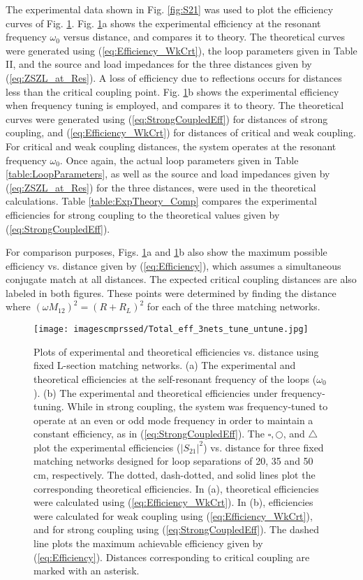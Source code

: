 \documentclass[journal]{IEEEtran}
\begin{document}
The experimental data shown in Fig. \ref{fig:S21} was used to plot the efficiency curves of Fig. \ref{fig:S21_v_Pow}. Fig. \ref{fig:S21_v_Pow}a shows the experimental efficiency at the resonant frequency $\omega_0$ versus distance, and compares it to theory. The theoretical curves were generated using (\ref{eq:Efficiency_WkCrt}), the loop parameters given in Table II, and the source and load impedances for the three distances given by (\ref{eq:ZSZL_at_Res}). A loss of efficiency due to reflections occurs for distances less than the critical coupling point. Fig. \ref{fig:S21_v_Pow}b shows the experimental efficiency when frequency tuning is employed, and compares it to theory. The theoretical curves were generated using (\ref{eq:StrongCoupledEff}) for distances of strong coupling, and (\ref{eq:Efficiency_WkCrt}) for distances of critical and weak coupling. For critical and weak coupling distances, the system operates at the resonant frequency $\omega_0$. Once again, the actual loop parameters given in Table \ref{table:LoopParameters}, as well as the source and load impedances given by (\ref{eq:ZSZL_at_Res}) for the three distances, were used in the theoretical calculations. Table \ref{table:ExpTheory_Comp} compares the experimental efficiencies for strong coupling to the theoretical values given by (\ref{eq:StrongCoupledEff}).

For comparison purposes, Figs. \ref{fig:S21_v_Pow}a and \ref{fig:S21_v_Pow}b also show the maximum possible efficiency vs. distance given by (\ref{eq:Efficiency}), which assumes a simultaneous conjugate match at all distances. The expected critical coupling distances are also labeled in both figures. These points were determined by finding the distance where $(\omega M_{12})^2 = (R + R_L)^2$ for each of the three matching networks.

\begin{figure}[htbp]
    \centering
    \texttt{[image: imagescmprssed/Total\_eff\_3nets\_tune\_untune.jpg]}
    \caption{Plots of experimental and theoretical efficiencies vs. distance using fixed L-section matching networks. (a) The experimental and theoretical efficiencies at the self-resonant frequency of the loops ($\omega_0$). (b) The experimental and theoretical efficiencies under frequency-tuning. While in strong coupling, the system was frequency-tuned to operate at an even or odd mode frequency in order to maintain a constant efficiency, as in (\ref{eq:StrongCoupledEff}). The $\square, \bigcirc$, and $\triangle$ plot the experimental efficiencies (${\left|S_{21}\right|}^2$) vs. distance for three fixed matching networks designed for loop separations of 20, 35 and 50 cm, respectively. The dotted, dash-dotted, and solid lines plot the corresponding theoretical efficiencies. In (a), theoretical efficiencies were calculated using (\ref{eq:Efficiency_WkCrt}). In (b), efficiencies were calculated for weak coupling using (\ref{eq:Efficiency_WkCrt}), and for strong coupling using (\ref{eq:StrongCoupledEff}). The dashed line plots the maximum achievable efficiency given by (\ref{eq:Efficiency}). Distances corresponding to critical coupling are marked with an asterisk.}
    \label{fig:S21_v_Pow}
\end{figure}
\end{document}
